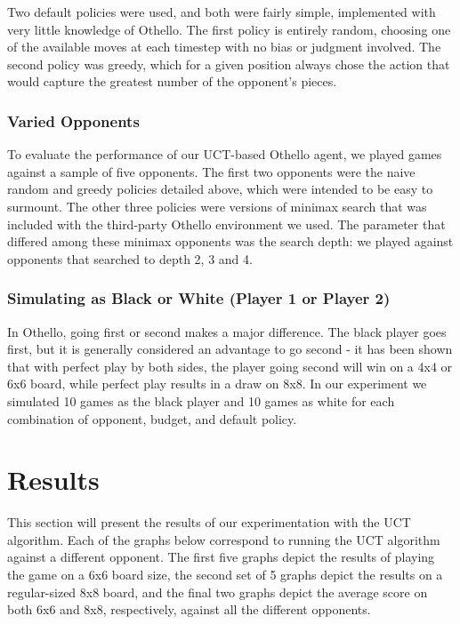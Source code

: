 \documentclass[12pt,letterpaper]{article}
\begin{document}
Two default policies were used, and both were fairly simple, implemented with very little knowledge of Othello. The first policy is entirely random, choosing one of the available moves at each timestep with no bias or judgment involved. The second policy was greedy, which for a given position always chose the action that would capture the greatest number of the opponent's pieces.

\subsubsection{Varied Opponents}
To evaluate the performance of our UCT-based Othello agent, we played games against a sample of five opponents. The first two opponents were the naive random and greedy policies detailed above, which were intended to be easy to surmount. The other three policies were versions of minimax search that was included with the third-party Othello environment we used. The parameter that differed among these minimax opponents was the search depth: we played against opponents that searched to depth 2, 3 and 4.

\subsubsection{Simulating as Black or White (Player 1 or Player 2)}
In Othello, going first or second makes a major difference. The black player goes first, but it is generally considered an advantage to go second - it has been shown that with perfect play by both sides, the player going second will win on a 4x4 or 6x6 board, while perfect play results in a draw on 8x8. In our experiment we simulated 10 games as the black player and 10 games as white for each combination of opponent, budget, and default policy.

\section{Results}
\label{results}

This section will present the results of our experimentation with the UCT algorithm. Each of the graphs below correspond to running the UCT algorithm against a different opponent.  The first five graphs depict the results of playing the game on a 6x6 board size, the second set of 5 graphs depict the results on a regular-sized 8x8 board, and the final two graphs depict the average score on both 6x6 and 8x8, respectively, against all the different opponents.
\end{document}
